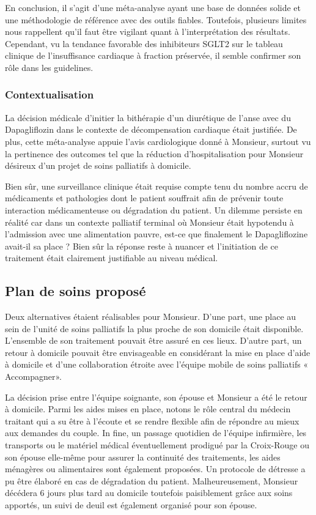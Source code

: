 En conclusion, il s’agit d’une méta-analyse ayant une base de données solide et une méthodologie de référence avec des outils fiables. Toutefois, plusieurs limites nous rappellent qu’il faut être vigilant quant à l’interprétation des résultats. Cependant, vu la tendance favorable des inhibiteurs SGLT2 sur le tableau clinique de l’insuffisance cardiaque à fraction préservée, il semble confirmer son rôle dans les guidelines. 

\subsubsection{Contextualisation} 
La décision médicale d’initier la bithérapie d’un diurétique de l’anse avec du Dapagliflozin dans le contexte de décompensation cardiaque était justifiée. De plus, cette méta-analyse appuie l’avis cardiologique donné à Monsieur, surtout vu la pertinence des outcomes tel que la réduction d’hospitalisation pour Monsieur désireux d’un projet de soins palliatifs à domicile.

Bien sûr, une surveillance clinique était requise compte tenu du nombre accru de médicaments et pathologies dont le patient souffrait afin de prévenir toute interaction médicamenteuse ou dégradation du patient. 
Un dilemme persiste en réalité car dans un contexte palliatif terminal où Monsieur était hypotendu à l’admission avec une alimentation pauvre, est-ce que finalement le Dapagliflozine avait-il sa place ? Bien sûr la réponse reste à nuancer et l’initiation de ce traitement était clairement justifiable au niveau médical. 

\subsection{Plan de soins proposé} 

Deux alternatives étaient réalisables pour Monsieur. D’une part, une place au sein de l’unité de soins palliatifs la plus proche de son domicile était disponible. L’ensemble de son traitement pouvait être assuré en ces lieux. D’autre part, un retour à domicile pouvait être envisageable en considérant la mise en place d’aide à domicile et d’une collaboration étroite avec l’équipe mobile de soins palliatifs « Accompagner».

La décision prise entre l’équipe soignante, son épouse et Monsieur a été le retour à domicile. Parmi les aides mises en place, notons le rôle central du médecin traitant qui a su être à l’écoute et se rendre flexible afin de répondre au mieux aux demandes du couple. In fine, un passage quotidien de l’équipe infirmière, les transports ou le matériel médical éventuellement prodigué par la Croix-Rouge ou son épouse elle-même pour assurer la continuité des traitements, les aides ménagères ou alimentaires sont également proposées. Un protocole de détresse a pu être élaboré en cas de dégradation du patient. Malheureusement, Monsieur décédera 6 jours plus tard au domicile toutefois paisiblement grâce aux soins apportés, un suivi de deuil est également organisé pour son épouse.

